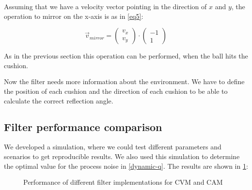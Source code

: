 \documentclass[notitlepage, a4paper, 11pt]{scrartcl}
\begin{document}
\begin{multicols}{2}
Assuming that we have a velocity vector pointing in the direction of $x$ and $y$, the operation to mirror on the x-axis is as in \cref{eq5}:

\begin{equation} 
    \label{eq5}
    \vec{v}_{mirror} = 
    \left(\!
    \begin{array}{c}
      v_x \\
      v_y
    \end{array}
    \!\right) \cdot
    \left(\!
    \begin{array}{c}
        -1 \\
        1
    \end{array}
    \!\right)
\end{equation}

As in the previous section this operation can be performed, when the ball hits the cushion.

Now the filter needs more information about the environment. We have to define the position of each cushion and the direction of each cushion to be able to calculate the correct reflection angle.

\subsection{Filter performance comparison} \label{perf-comp}

We developed a simulation, where we could test different parameters and scenarios to get reproducible results. 
We also used this simulation to determine the optimal value for the process noise in \cref{dynamic-q}. The results are shown in \cref{fig:sim-results}:

\begin{figure}[H]
    \centering
    \caption{Performance of different filter implementations for CVM and CAM}
    \label{fig:sim-results}
\end{figure}


\end{multicols}
\end{document}
